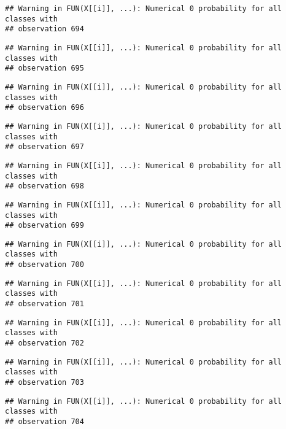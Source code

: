 \documentclass[
]{article}
\begin{document}
\begin{verbatim}
## Warning in FUN(X[[i]], ...): Numerical 0 probability for all classes with
## observation 694
\end{verbatim}

\begin{verbatim}
## Warning in FUN(X[[i]], ...): Numerical 0 probability for all classes with
## observation 695
\end{verbatim}

\begin{verbatim}
## Warning in FUN(X[[i]], ...): Numerical 0 probability for all classes with
## observation 696
\end{verbatim}

\begin{verbatim}
## Warning in FUN(X[[i]], ...): Numerical 0 probability for all classes with
## observation 697
\end{verbatim}

\begin{verbatim}
## Warning in FUN(X[[i]], ...): Numerical 0 probability for all classes with
## observation 698
\end{verbatim}

\begin{verbatim}
## Warning in FUN(X[[i]], ...): Numerical 0 probability for all classes with
## observation 699
\end{verbatim}

\begin{verbatim}
## Warning in FUN(X[[i]], ...): Numerical 0 probability for all classes with
## observation 700
\end{verbatim}

\begin{verbatim}
## Warning in FUN(X[[i]], ...): Numerical 0 probability for all classes with
## observation 701
\end{verbatim}

\begin{verbatim}
## Warning in FUN(X[[i]], ...): Numerical 0 probability for all classes with
## observation 702
\end{verbatim}

\begin{verbatim}
## Warning in FUN(X[[i]], ...): Numerical 0 probability for all classes with
## observation 703
\end{verbatim}

\begin{verbatim}
## Warning in FUN(X[[i]], ...): Numerical 0 probability for all classes with
## observation 704
\end{verbatim}
\end{document}
